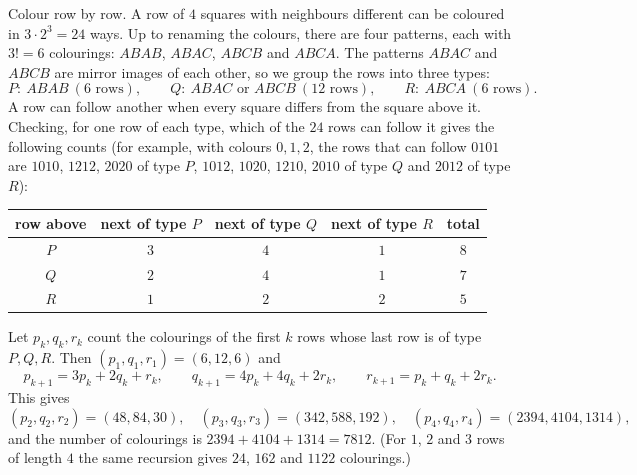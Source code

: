 Colour row by row. A row of $4$ squares with neighbours different can be coloured in $3\cdot2^3=24$ ways. Up to renaming the colours, there are four patterns, each with $3!=6$ colourings: $ABAB$, $ABAC$, $ABCB$ and $ABCA$. The patterns $ABAC$ and $ABCB$ are mirror images of each other, so we group the rows into three types:
\[P:\ ABAB\ (6\text{ rows}),\qquad Q:\ ABAC\text{ or }ABCB\ (12\text{ rows}),\qquad R:\ ABCA\ (6\text{ rows}).\]
A row can follow another when every square differs from the square above it. Checking, for one row of each type, which of the $24$ rows can follow it gives the following counts (for example, with colours $0,1,2$, the rows that can follow $0101$ are $1010$, $1212$, $2020$ of type $P$, $1012$, $1020$, $1210$, $2010$ of type $Q$ and $2012$ of type $R$):
\begin{center}
\begin{tabular}{c|ccc|c}
row above & next of type $P$ & next of type $Q$ & next of type $R$ & total\\ \hline
$P$ & $3$ & $4$ & $1$ & $8$\\
$Q$ & $2$ & $4$ & $1$ & $7$\\
$R$ & $1$ & $2$ & $2$ & $5$
\end{tabular}
\end{center}
Let $p_k,q_k,r_k$ count the colourings of the first $k$ rows whose last row is of type $P,Q,R$. Then $(p_1,q_1,r_1)=(6,12,6)$ and
\[p_{k+1}=3p_k+2q_k+r_k,\qquad q_{k+1}=4p_k+4q_k+2r_k,\qquad r_{k+1}=p_k+q_k+2r_k.\]
This gives
\[(p_2,q_2,r_2)=(48,84,30),\quad(p_3,q_3,r_3)=(342,588,192),\quad(p_4,q_4,r_4)=(2394,4104,1314),\]
and the number of colourings is $2394+4104+1314=\boxed{7812}$. (For $1$, $2$ and $3$ rows of length $4$ the same recursion gives $24$, $162$ and $1122$ colourings.)
